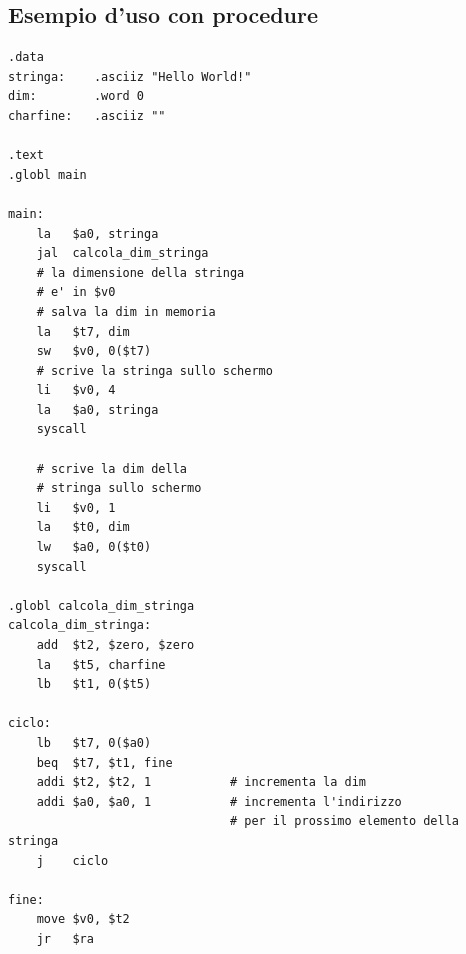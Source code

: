 \subsection{Esempio d'uso con procedure}
\begin{lstlisting}
.data
stringa:    .asciiz "Hello World!"
dim:        .word 0
charfine:   .asciiz ""

.text
.globl main

main:
    la   $a0, stringa
    jal  calcola_dim_stringa
    # la dimensione della stringa
    # e' in $v0
    # salva la dim in memoria
    la   $t7, dim
    sw   $v0, 0($t7)
    # scrive la stringa sullo schermo
    li   $v0, 4
    la   $a0, stringa
    syscall

    # scrive la dim della
    # stringa sullo schermo
    li   $v0, 1
    la   $t0, dim
    lw   $a0, 0($t0)
    syscall

.globl calcola_dim_stringa
calcola_dim_stringa:
    add  $t2, $zero, $zero
    la   $t5, charfine
    lb   $t1, 0($t5)

ciclo:
    lb   $t7, 0($a0)
    beq  $t7, $t1, fine
    addi $t2, $t2, 1           # incrementa la dim
    addi $a0, $a0, 1           # incrementa l'indirizzo
                               # per il prossimo elemento della stringa
    j    ciclo

fine:
    move $v0, $t2
    jr   $ra
\end{lstlisting}

